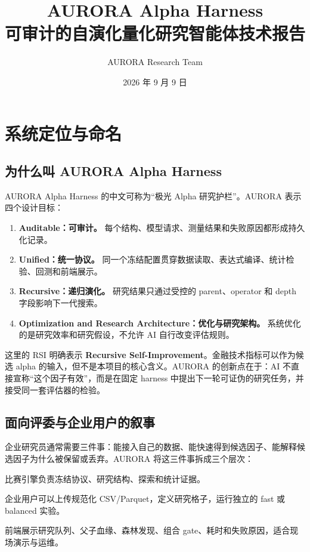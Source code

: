 \documentclass[11pt,a4paper]{article}
\title{\vspace{-1.2cm}\textcolor{aurorablue}{\Huge AURORA Alpha Harness}\\[0.3em]
\Large 可审计的自演化量化研究智能体技术报告}
\author{AURORA Research Team}
\date{2026 年 9 月 9 日}
\newcommand{\systemname}{AURORA Alpha Harness}
\newcommand{\important}[1]{\textbf{#1}}
\begin{document}


\tableofcontents
\newpage

\section{系统定位与命名}
\subsection{为什么叫 AURORA Alpha Harness}
\systemname{} 的中文可称为“极光 Alpha 研究护栏”。AURORA 表示四个设计目标：
\begin{enumerate}[leftmargin=2em]
  \item \textbf{Auditable：可审计。} 每个结构、模型请求、测量结果和失败原因都形成持久化记录。
  \item \textbf{Unified：统一协议。} 同一个冻结配置贯穿数据读取、表达式编译、统计检验、回测和前端展示。
  \item \textbf{Recursive：递归演化。} 研究结果只通过受控的 parent、operator 和 depth 字段影响下一代搜索。
  \item \textbf{Optimization and Research Architecture：优化与研究架构。} 系统优化的是研究效率和研究假设，不允许 AI 自行改变评估规则。
\end{enumerate}

这里的 RSI 明确表示 \important{Recursive Self-Improvement}。金融技术指标可以作为候选 alpha 的输入，但不是本项目的核心含义。AURORA 的创新点在于：AI 不直接宣称“这个因子有效”，而是在固定 harness 中提出下一轮可证伪的研究任务，并接受同一套评估器的检验。

\subsection{面向评委与企业用户的叙事}
企业研究员通常需要三件事：能接入自己的数据、能快速得到候选因子、能解释候选因子为什么被保留或丢弃。AURORA 将这三件事拆成三个层次：
\begin{description}[leftmargin=2em]
  \item[Research engine] 比赛引擎负责冻结协议、研究结构、探索和统计证据。
  \item[Research SDK] 企业用户可以上传规范化 CSV/Parquet，定义研究格子，运行独立的 fast 或 balanced 实验。
  \item[Control panel] 前端展示研究队列、父子血缘、森林发现、组合 gate、耗时和失败原因，适合现场演示与运维。
\end{description}

\clearpage

\end{document}
